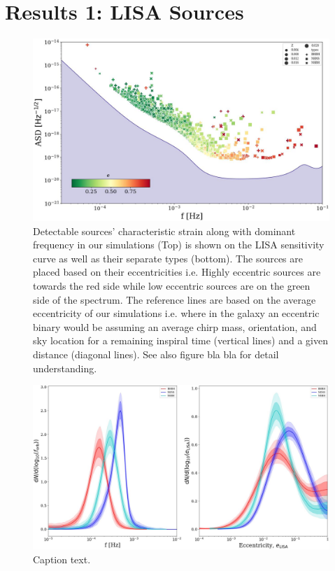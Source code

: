\documentclass[12pt, journal, onecolumn]{IEEEtran}
\begin{document}
    \section{Results 1: LISA Sources}
    \label{sec:r}
    \begin{subfigures}
        \begin{figure}[!t]
            \centering
            \includegraphics[width=0.82\linewidth]{images/first}
            \caption{\label{first}Detectable sources' characteristic strain along with dominant frequency in our simulations (Top) is shown on the LISA sensitivity curve as well as their separate types (bottom). The sources are placed based on their eccentricities i.e. Highly eccentric sources are towards the red side while low eccentric sources are on the green side of the spectrum. The reference lines are based on the average eccentricity of our simulations i.e. where in the galaxy an eccentric binary would be assuming an average chirp mass, orientation, and sky location for a remaining inspiral time (vertical lines) and a given distance (diagonal lines). See also figure bla bla for detail understanding.}\label{detect} %
        \end{figure}
        \begin{figure}
            \includegraphics[width=\linewidth]{images/second}
            \caption{Caption text.}\label{fig:freq} %
        \end{figure}
    \end{subfigures}
\end{document}
